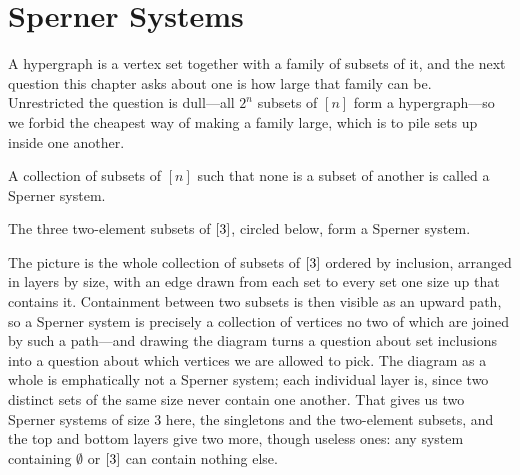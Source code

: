 \section{Sperner Systems}

A hypergraph is a vertex set together with a family of subsets of it, and the next question this chapter asks about one is how large that family can be. Unrestricted the question is dull---all $2^n$ subsets of $[n]$ form a hypergraph---so we forbid the cheapest way of making a family large, which is to pile sets up inside one another.

\begin{boxdefinition}
    A collection of subsets of $[n]$ such that none is a subset of another is called a Sperner system.
\end{boxdefinition}

\begin{boxexample}
    The three two-element subsets of $\left[ 3 \right]$, circled below, form a Sperner system.
\end{boxexample}

\begin{figure}[H]
    \centering
\end{figure}

The picture is the whole collection of subsets of $\left[ 3 \right]$ ordered by inclusion, arranged in layers by size, with an edge drawn from each set to every set one size up that contains it. Containment between two subsets is then visible as an upward path, so a Sperner system is precisely a collection of vertices no two of which are joined by such a path---and drawing the diagram turns a question about set inclusions into a question about which vertices we are allowed to pick. The diagram as a whole is emphatically not a Sperner system; each individual layer is, since two distinct sets of the same size never contain one another. That gives us two Sperner systems of size $3$ here, the singletons and the two-element subsets, and the top and bottom layers give two more, though useless ones: any system containing $\emptyset$ or $\left[ 3 \right]$ can contain nothing else.

